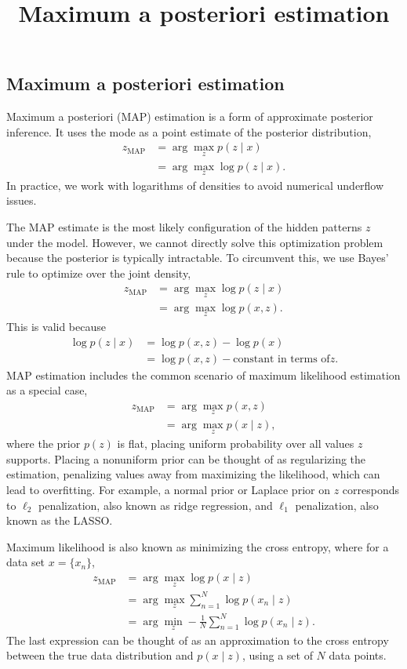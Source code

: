 \title{Maximum a posteriori estimation}

\subsection{Maximum a posteriori estimation}

Maximum a posteriori (MAP) estimation is a form of approximate
posterior inference. It uses the mode as a point estimate of the
posterior distribution,
\begin{align*}
  z_\text{MAP}
  &=
  \arg \max_z
  p(z \mid x)\\
  &=
  \arg \max_z
  \log p(z \mid x).
\end{align*}
In practice, we work with logarithms of densities to avoid numerical underflow
issues.

The MAP estimate is the most likely configuration of the hidden patterns $z$
under the model. However, we cannot directly solve this optimization problem
because the posterior is typically intractable. To circumvent this, we use Bayes' rule to
optimize over the joint density,
\begin{align*}
  z_\text{MAP}
  &=
  \arg \max_z
  \log p(z \mid x)\\
  &=
  \arg \max_z
  \log p(x, z).
\end{align*}
This is valid because
\begin{align*}
  \log p(z \mid x)
  &=
  \log p(x, z) - \log p(x)\\
  &=
  \log p(x, z) - \text{constant in terms of} z.
\end{align*}
MAP estimation includes the common scenario of maximum
likelihood estimation as a special case,
\begin{align*}
  z_\text{MAP}
  &=
  \arg \max_z
  p(x, z)\\
  &=
  \arg \max_z
  p(x\mid z),
\end{align*}
where the prior $p(z)$ is flat, placing uniform probability over all
values $z$ supports. Placing a nonuniform prior can be thought of as
regularizing the estimation, penalizing values away from maximizing
the likelihood, which can lead to overfitting. For example, a normal
prior or Laplace prior on $z$ corresponds to $\ell_2$ penalization, also
known as ridge regression, and $\ell_1$ penalization, also
known as the LASSO.

Maximum likelihood is also known as minimizing the cross entropy, where
for a data set $x=\{x_n\}$,
\begin{align*}
  z_\text{MAP}
  &=
  \arg \max_z
  \log p(x\mid z)
  \\
  &=
  \arg \max_z
  \sum_{n=1}^N \log p(x_n\mid z)
  \\
  &=
  \arg \min_z
  -\frac{1}{N}\sum_{n=1}^N \log p(x_n\mid z).
\end{align*}
The last expression can be thought of as an approximation to the cross
entropy between the true data distribution and $p(x\mid z)$,
using a set of $N$ data points.

